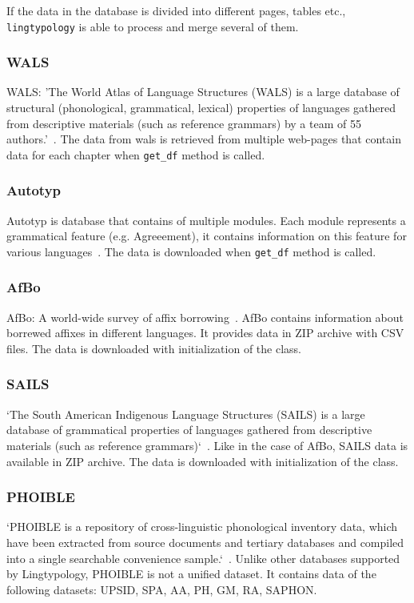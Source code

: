 \documentclass[a4paper,12pt]{article}
\begin{document}
If the data in the database is divided into different pages, tables etc., \texttt{lingtypology} is able to process and merge several of them.

\subsubsection{WALS}
WALS: 'The World Atlas of Language Structures (WALS) is a large database of structural (phonological, grammatical, lexical) properties of languages gathered from descriptive materials (such as reference grammars) by a team of 55 authors.'~\parencite{wals}. The data from wals is retrieved from multiple web-pages that contain data for each chapter when \texttt{get\_df} method is called.

\subsubsection{Autotyp}
Autotyp is database that contains of multiple modules. Each module represents a grammatical feature (e.g. Agreeement), it contains information on this feature for various languages~\parencite{autotyp}. The data is downloaded when \texttt{get\_df} method is called.

\subsubsection{AfBo}
AfBo: A world-wide survey of affix borrowing~\parencite{afbo}. AfBo contains information about borrewed affixes in different languages. It provides data in ZIP archive with CSV files. The data is downloaded with initialization of the class.

\subsubsection{SAILS}
`The South American Indigenous Language Structures (SAILS) is a large database of grammatical properties of languages gathered from descriptive materials (such as reference grammars)`~\parencite{sails}. Like in the case of AfBo, SAILS data is available in ZIP archive. The data is downloaded with initialization of the class.

\subsubsection{PHOIBLE}
`PHOIBLE is a repository of cross-linguistic phonological inventory data, which have been extracted from source documents and tertiary databases and compiled into a single searchable convenience sample.`~\parencite{phoible}.
Unlike other databases supported by Lingtypology, PHOIBLE is not a unified dataset. It contains data of the following datasets: UPSID, SPA, AA, PH, GM, RA, SAPHON.
\end{document}
